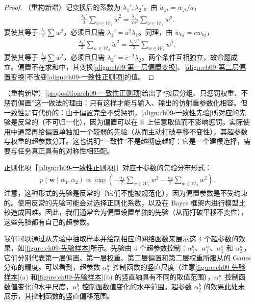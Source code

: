 \documentclass[../../main.tex]{subfiles}
\begin{document}
\begin{proof}
（重构新增）记变换后的系数为 $\lambda_{1}',\lambda_{2}'$。由 $\tilde{w}_{ji}=w_{ji}/a$，
\begin{align*}
\frac{\lambda_{1}'}{2}\sum_{w\in\mathcal{W}_{1}}\tilde{w}^{2}=\frac{\lambda_{1}'}{2a^{2}}\sum_{w\in\mathcal{W}_{1}}w^{2}.
\end{align*}
要使其等于 $\frac{\lambda_{1}}{2}\sum w^{2}$，必须且只需 $\lambda_{1}'=a^{2}\lambda_{1}$。同理，由 $\tilde{w}_{kj}=cw_{kj}$，
\begin{align*}
\frac{\lambda_{2}'}{2}\sum_{w\in\mathcal{W}_{2}}\tilde{w}^{2}=\frac{\lambda_{2}'c^{2}}{2}\sum_{w\in\mathcal{W}_{2}}w^{2},
\end{align*}
要使其等于 $\frac{\lambda_{2}}{2}\sum w^{2}$，必须且只需 $\lambda_{2}'=c^{-2}\lambda_{2}$。两个条件互相独立，故命题成立。偏置不在求和中，其变换\eqref{align:ch09-第一层偏置变换}、\eqref{align:ch09-第二层偏置变换}不改变\eqref{align:ch09-一致性正则项}的值。
\end{proof}

\begin{remark}（重构新增）\cref{proposition:ch09-一致性正则项}给出了“按层分组、只惩罚权重、不惩罚偏置”这一做法的理由：只有这样才能与输入、输出的仿射重参数化相容。但一致性是有代价的：由于偏置完全不受惩罚，\eqref{align:ch09-一致性先验}所对应的先验是反常的（不可归一化），因为偏置可以在 $\mathbb{R}$ 上任意取值而不影响惩罚。实际使用中通常再给偏置单独加一个较弱的先验（从而主动打破平移不变性），其超参数与权重的超参数分开。这也说明“一致性”不是越彻底越好：它是一个建模选择，需要与任务真正具有的对称性相匹配。
\end{remark}

正则化项［\eqref{align:ch09-一致性正则项}］对应于参数的先验分布形式：
\begin{align}
p(\boldsymbol{w}\mid\alpha_{1},\alpha_{2})\propto\exp\!\left(-\frac{\alpha_{1}}{2}\sum_{w\in\mathcal{W}_{1}}w^{2}-\frac{\alpha_{2}}{2}\sum_{w\in\mathcal{W}_{2}}w^{2}\right).
\label{align:ch09-一致性先验}
\end{align}
注意，这种形式的先验是反常的（它们不能被规范化），因为偏置参数是不受约束的。使用反常的先验可能会对选择正则化系数，以及在 Bayes 框架内进行模型比较造成困难。因此，我们通常会为偏置设置单独的先验（从而打破平移不变性），这些先验都有自己的超参数。

我们可以通过从先验中抽取样本并绘制相应的网络函数来展示这 $4$ 个超参数的效果，如\cref{figure:ch09-先验样本}所示。先验由 $4$ 个超参数控制：$\alpha_{1}^{b}$、$\alpha_{1}^{w}$、$\alpha_{2}^{b}$ 和 $\alpha_{2}^{w}$，它们分别代表第一层偏置、第一层权重、第二层偏置和第二层权重所服从的 Gauss 分布的精度。可以看到，超参数 $\alpha_{2}^{w}$ 控制函数的竖直尺度（注意\cref{figure:ch09-先验样本}(a) 和\cref{figure:ch09-先验样本}(b) 的竖直轴具有不同的取值范围），$\alpha_{1}^{w}$ 控制函数值变化的水平尺度，$\alpha_{1}^{b}$ 控制函数值变化的水平范围。超参数 $\alpha_{2}^{b}$ 的效果此处未展示，其控制函数的竖直偏移范围。
\end{document}
